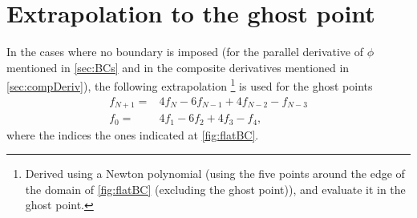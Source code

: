 \section{Extrapolation to the ghost point}
\label{sec:extrapolGhost}
%
In the cases where no boundary is imposed (for the parallel derivative of $\phi$ mentioned in \cref{sec:BCs} and in the composite derivatives mentioned in \cref{sec:compDeriv}), the following extrapolation %
%
\footnote{
Derived using a Newton polynomial (using the five points around the edge of the domain of \cref{fig:flatBC} (excluding the ghost point)), and evaluate it in the ghost point.
}%
is used for the ghost points
%
\begin{align}
    f_{N+1} =& 4f_{N} - 6f_{N-1} + 4f_{N-2} - f_{N-3}
    \label{eq:extraPolUp}
    \\
    f_{0} =& 4f_{1} - 6f_{2} + 4f_{3} - f_{4},
    \label{eq:extraPolDown}
\end{align}
%
where the indices the ones indicated at \cref{fig:flatBC}.
